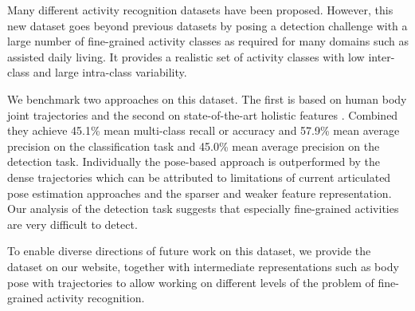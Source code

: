 Many different activity recognition datasets have been proposed. 
However, this new dataset goes beyond previous datasets 
by posing a detection challenge with a large number of fine-grained activity classes as required for many domains such as assisted daily living. It provides a realistic set of \DBnActivities activity classes with low inter-class and large intra-class variability. 

We benchmark two approaches on this dataset. The first is based on human body joint trajectories and the second on state-of-the-art holistic features \citep{wang11cvpr}. Combined they achieve 45.1\% mean multi-class recall or accuracy and 57.9\% mean average precision on the classification task and 45.0\% mean average precision on the detection task. Individually the pose-based approach is outperformed by the dense trajectories which can be attributed to limitations of current articulated pose estimation approaches and the sparser and weaker feature representation.
Our analysis of the detection task suggests that especially fine-grained activities are very difficult to detect.

To enable diverse directions of future work on this dataset, we provide the dataset on our website, together with intermediate representations such as body pose with trajectories to allow working on different levels of the problem of fine-grained activity recognition.


\newcommand{\midrulerallres}{\cmidrule(lr){1-1} \cmidrule(lr){2-2} \cmidrule(lr){3-5} \cmidrule(lr){6-7}}


